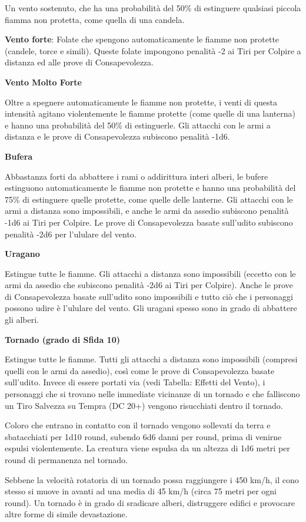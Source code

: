 \begin{multicols}{2}
Un vento sostenuto, che ha una probabilità del 50\% di estinguere qualsiasi piccola fiamma non protetta, come quella di una candela.

\textbf{Vento forte}: Folate che spengono automaticamente le fiamme non protette (candele, torce e simili). Queste folate impongono penalità -2 ai Tiri per Colpire a distanza ed alle prove di Consapevolezza.

\textbf{Vento Molto Forte}

Oltre a spegnere automaticamente le fiamme non protette, i venti di questa intensità agitano violentemente le fiamme protette (come quelle di una lanterna) e hanno una probabilità del 50\% di estinguerle. Gli attacchi con le armi a distanza e le prove di Consapevolezza subiscono penalità -1d6.

\textbf{Bufera}

Abbastanza forti da abbattere i rami o addirittura interi alberi, le bufere estinguono automaticamente le fiamme non protette e hanno una probabilità del 75\% di estinguere quelle protette, come quelle delle lanterne. Gli attacchi con le armi a distanza sono impossibili, e anche le armi da assedio subiscono penalità -1d6 ai Tiri per Colpire. Le prove di Consapevolezza basate sull'udito subiscono penalità -2d6 per l'ululare del vento.

\textbf{Uragano}

Estingue tutte le fiamme. Gli attacchi a distanza sono impossibili (eccetto con le armi da assedio che subiscono penalità -2d6 ai Tiri per Colpire). Anche le prove di Consapevolezza basate sull'udito sono impossibili e tutto ciò che i personaggi possono udire è l'ululare del vento. Gli uragani spesso sono in grado di abbattere gli alberi.

\textbf{Tornado (grado di Sfida 10)}

Estingue tutte le fiamme. Tutti gli attacchi a distanza sono impossibili (compresi quelli con le armi da assedio), così come le prove di Consapevolezza basate sull'udito. Invece di essere portati via (vedi Tabella: Effetti del Vento), i personaggi che si trovano nelle immediate vicinanze di un tornado e che falliscono un Tiro Salvezza su Tempra (DC 20+) vengono risucchiati dentro il tornado.

Coloro che entrano in contatto con il tornado vengono sollevati da terra e sbatacchiati per 1d10 round, subendo 6d6 danni per round, prima di venirne espulsi violentemente. La creatura viene espulsa da un altezza di 1d6 metri per round di permanenza nel tornado.

Sebbene la velocità rotatoria di un tornado possa raggiungere i 450 km/h, il cono stesso si muove in avanti ad una media di 45 km/h (circa 75 metri per ogni round). Un tornado è in grado di sradicare alberi, distruggere edifici e provocare altre forme di simile devastazione.

\end{multicols}

